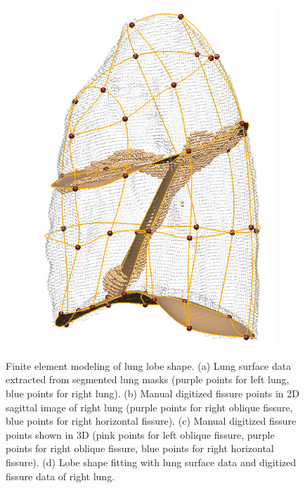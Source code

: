 {\begin{figure}[htbp]
\begin{subfigure}{.32\linewidth}
  \includegraphics[width=\linewidth,trim={{.0\wd0} {.0\wd0} {.0\wd0} {.0\wd0}},clip]{Segmentation/Image/LobeFitting2.png}
  \caption{}
  \label{fig:LobeShapeGenereation-d} 
\end{subfigure}
\caption{Finite element modeling of lung lobe shape. (a) Lung surface data extracted from segmented lung masks (purple points for left lung, blue points for right lung). (b) Manual digitized fissure points in 2D sagittal image of right lung (purple points for right oblique fissure, blue points for right horizontal fissure). (c) Manual digitized fissure points shown in 3D (pink points for left oblique fissure, purple points for right oblique fissure, blue points for right horizontal fissure). (d) Lobe shape fitting with lung surface data and digitized fissure data of right lung.}
\label{fig:LobeShapeGenereation}
\end{figure}

}
